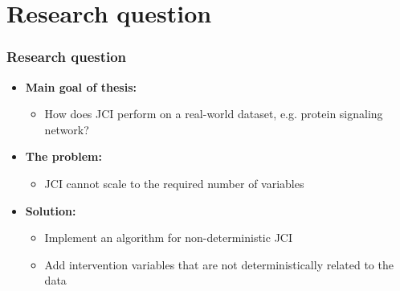 \documentclass[10pt, compress]{beamer}
\begin{document}
    

\section{Research question}
\begin{frame}
    \frametitle{Research question}
    \begin{itemize}
        \item \textbf{Main goal of thesis:}
            \begin{itemize}[<+- | alert@+>]
                \item How does JCI perform on a real-world dataset,  e.g. protein signaling network? 
            \end{itemize}
    
        \item\textbf{The problem:}
            \begin{itemize}[<+- | alert@+>]
                \item JCI cannot scale to the required number of variables
            \end{itemize}
    
        \item\textbf{Solution:}
            \begin{itemize}[<+- | alert@+>]
                \item Implement an algorithm for non-deterministic JCI
                \item Add intervention variables that are not deterministically related to the data 
            \end{itemize}
    \end{itemize}
\end{frame}

\end{document}
